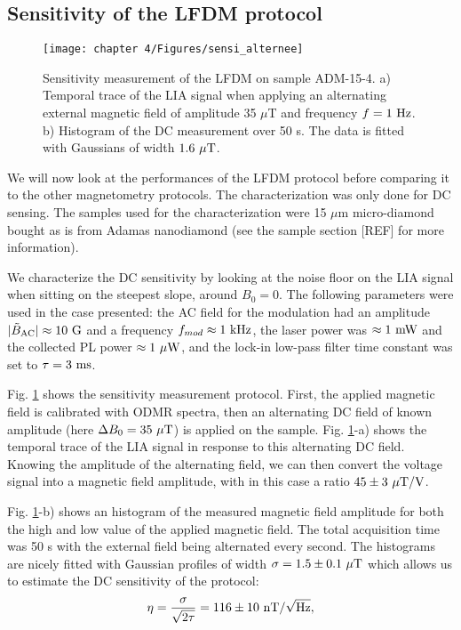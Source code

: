 \documentclass[a4paper,11pt]{report}
\begin{document}
\begin{refsection}
\subsection{Sensitivity of the LFDM protocol}
\begin{figure}[h!]
\centering
\texttt{[image: chapter 4/Figures/sensi\_alternee]}
\caption{Sensitivity measurement of the LFDM on sample ADM-15-4. a) Temporal trace of the LIA signal when applying an alternating external magnetic field of amplitude 35 $\mu$T and frequency $f=1\ \rm Hz$. b) Histogram of the DC measurement over 50 s. The data is fitted with Gaussians of width $1.6\ \rm{\mu T}$.}
\label{sensei alternee}
\end{figure}

We will now look at the performances of the LFDM protocol before comparing it to the other magnetometry protocols. The characterization was only done for DC sensing. The samples used for the characterization were 15 $\mu$m micro-diamond bought as is from Adamas nanodiamond (see the sample section [REF] for more information).

We characterize the DC sensitivity by looking at the noise floor on the LIA signal when sitting on the steepest slope, around $B_0=0$. The following parameters were used in the case presented: the AC field for the modulation had an amplitude $|\tilde{B}_{\rm AC}|\approx 10\ \rm G$ and a frequency $f_{mod} \approx 1\ \rm kHz$, the laser power was $\approx 1\ \rm mW$ and the collected PL power $\approx 1\ \rm{\mu W}$, and the lock-in low-pass filter time constant was set to $\tau=3\ \rm ms$.

Fig. \ref{sensei alternee} shows the sensitivity measurement protocol. First, the applied magnetic field is calibrated with ODMR spectra, then an alternating DC field of known amplitude (here $\Delta B_0=35\ \rm{\mu T}$) is applied on the sample. Fig. \ref{sensei alternee}-a) shows the temporal trace of the LIA signal in response to this alternating DC field. Knowing the amplitude of the alternating field, we can then convert the voltage signal into a magnetic field amplitude, with in this case a ratio $45 \pm 3\ \rm{\mu T /V}$.

Fig. \ref{sensei alternee}-b) shows an histogram of the measured magnetic field amplitude for both the high and low value of the applied magnetic field. The total acquisition time was 50 s with the external field being alternated every second. The histograms are nicely fitted with Gaussian profiles of width $\sigma=1.5\pm 0.1\ \rm{\mu T}$ which allows us to estimate the DC sensitivity of the protocol:
\begin{equation}
\eta = \frac{\sigma}{\sqrt{2 \tau}}= 116 \pm 10\ \rm{nT} / \sqrt{\rm Hz},
\end{equation}


\end{refsection}
\end{document}
